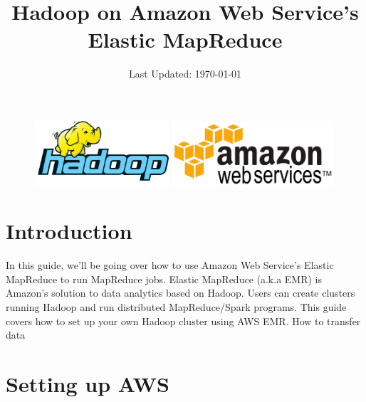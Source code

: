\documentclass{article}
\title{Hadoop on Amazon Web Service's\\ Elastic MapReduce} %
\date{Last Updated: \today} %
\begin{document}
\maketitle %


\begin{figure}[h!]
 \centering
 \includegraphics[width=50mm]{images/hadoop}\hspace{15mm}
 \includegraphics[width=60mm]{images/AWS}
\end{figure} 


\section*{Introduction} %

In this guide, we'll be going over how to use Amazon Web Service's Elastic MapReduce to run MapReduce jobs. Elastic MapReduce (a.k.a EMR) is Amazon's solution to data analytics based on Hadoop. Users can create clusters running Hadoop and run distributed MapReduce/Spark programs. This guide covers how to set up your own Hadoop cluster using AWS EMR. How to transfer data


\hypersetup{hidelinks}
\tableofcontents


\section{Setting up AWS}
\end{document}
